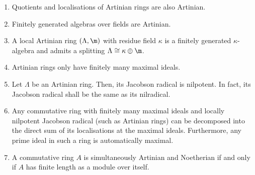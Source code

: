         \begin{lemma} \label{lemma: artinian_rings_properties}
            \noindent
            \begin{enumerate}
                \item Quotients and localisations of Artinian rings are also Artinian.
                \item \cite[\href{https://stacks.math.columbia.edu/tag/00J6}{Tag 00J6}]{stacks} Finitely generated algebras over fields are Artinian.
                \item A local Artinian ring $(\Lambda, \m)$ with residue field $\kappa$ is a finitely generated $\kappa$-algebra and admits a splitting $\Lambda \cong \kappa \oplus \m$.
                \item \cite[\href{https://stacks.math.columbia.edu/tag/00J7}{Tag 00J7}]{stacks} Artinian rings only have finitely many maximal ideals.
                \item \cite[\href{https://stacks.math.columbia.edu/tag/00J8}{Tag 00J8}]{stacks} Let $\Lambda$ be an Artinian ring. Then, its Jacobson radical is nilpotent. In fact, its Jacobson radical shall be the same as its nilradical.
                \item \cite[\href{https://stacks.math.columbia.edu/tag/00JA}{Tag 00JA}]{stacks} Any commutative ring with finitely many maximal ideals and locally nilpotent Jacobson radical (such as Artinian rings) can be decomposed into the direct sum of its localisations at the maximal ideals. Furthermore, any prime ideal in such a ring is automatically maximal.
                \item \cite[\href{https://stacks.math.columbia.edu/tag/00JB}{Tag 00JB}]{stacks} A commutative ring $A$ is simultaneously Artinian and Noetherian if and only if $A$ has finite length as a module over itself. 
            \end{enumerate}
        \end{lemma}
        
